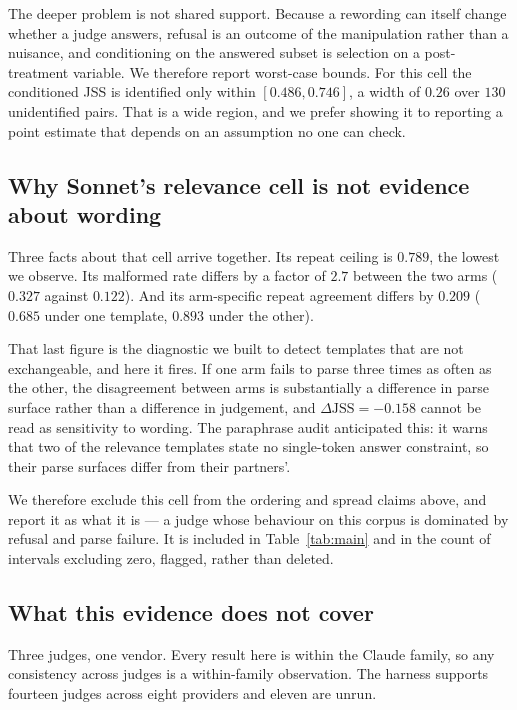The deeper problem is not shared support. Because a rewording can itself change
whether a judge answers, refusal is an outcome of the manipulation rather than a
nuisance, and conditioning on the answered subset is selection on a
post-treatment variable. We therefore report
worst-case bounds. For this cell the conditioned JSS is identified only within
$[0.486, 0.746]$, a width of $0.26$ over $130$ unidentified pairs. That is a wide
region, and we prefer showing it to reporting a point estimate that depends on an
assumption no one can check.

\subsection{Why Sonnet's relevance cell is not evidence about wording}
\label{sec:results-sonnet-relevance}

Three facts about that cell arrive together. Its repeat ceiling is $0.789$, the
lowest we observe. Its malformed rate differs by a factor of $2.7$ between the
two arms ($0.327$ against $0.122$). And its arm-specific repeat agreement differs
by $0.209$ ($0.685$ under one template, $0.893$ under the other).

That last figure is the diagnostic we built to detect templates that are not
exchangeable, and here it fires. If one arm fails to parse three times as often
as the other, the disagreement between arms is substantially a difference in
parse surface rather than a difference in judgement, and
$\Delta\mathrm{JSS}=-0.158$ cannot be read as sensitivity to wording. The
paraphrase audit anticipated this: it warns that two of the relevance templates
state no single-token answer constraint, so their parse surfaces differ from
their partners'.

We therefore exclude this cell from the ordering and spread claims above, and
report it as what it is --- a judge whose behaviour on this corpus is dominated
by refusal and parse failure. It is included in Table~\ref{tab:main} and in the
count of intervals excluding zero, flagged, rather than deleted.

\subsection{What this evidence does not cover}
\label{sec:results-limits}

Three judges, one vendor. Every result here is within the Claude family, so any
consistency across judges is a within-family observation. The harness supports
fourteen judges across eight providers and eleven are unrun.


